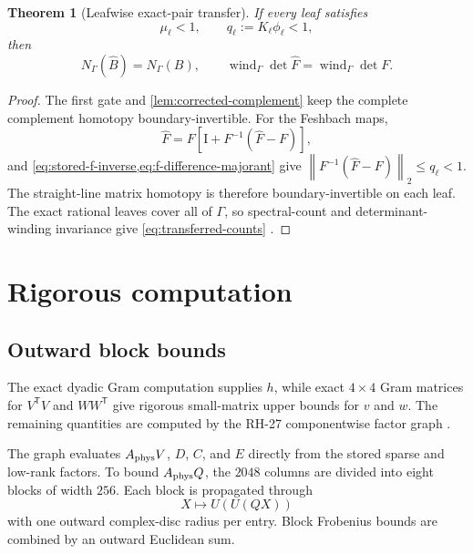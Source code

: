 \documentclass[11pt]{article}
\newtheorem{theorem}{Theorem}[section]
\theoremstyle{definition}
\theoremstyle{remark}
\newcommand{\Id}{\mathrm I}
\newcommand{\norm}[1]{\left\lVert#1\right\rVert}
\newcommand{\wind}{\operatorname{wind}}
\newcommand{\Aphys}{A_{\rm phys}}
\begin{document}
\begin{theorem}[Leafwise exact-pair transfer]
\label{thm:leafwise-transfer}
If every leaf satisfies
\begin{equation}
 \mu_\ell<1,\qquad
 q_\ell:=K_\ell\phi_\ell<1,
 \label{eq:two-gates}
\end{equation}
then
\begin{equation}
 N_\Gamma(\widehat B)=N_\Gamma(B),
 \qquad
 \wind_\Gamma\det\widehat F
 =\wind_\Gamma\det F.
 \label{eq:transferred-counts}
\end{equation}
\end{theorem}

\begin{proof}
The first gate and \cref{lem:corrected-complement} keep the complete
complement homotopy boundary-invertible.  For the Feshbach maps,
\[
 \widehat F
 =F\left[\Id+F^{-1}(\widehat F-F)\right],
\]
and \cref{eq:stored-f-inverse,eq:f-difference-majorant} give
\(\norm{F^{-1}(\widehat F-F)}_2\leq q_\ell<1\).
The straight-line matrix homotopy is therefore boundary-invertible on each
leaf.  The exact rational leaves cover all of \(\Gamma\), so spectral-count
and determinant-winding invariance give \cref{eq:transferred-counts}
\citep{Ahlfors1979,GohbergSigal1971}.
\end{proof}

\section{Rigorous computation}
\label{sec:computation}

\subsection{Outward block bounds}

The exact dyadic Gram computation supplies \(h\), while exact \(4\times4\)
Gram matrices for \(V^{\mathsf T}V\) and \(WW^{\mathsf T}\) give rigorous
small-matrix upper bounds for \(v\) and \(w\).  The remaining quantities are
computed by the RH-27 componentwise factor graph
\citep{WangOutwardCode2026}.

The graph evaluates \(\Aphys V\), \(D\), \(C\), and \(E\) directly from the
stored sparse and low-rank factors.  To bound \(\Aphys Q\), the \(2048\)
columns are divided into eight blocks of width \(256\).  Each block is
propagated through
\[
 X\longmapsto U(U(QX))
\]
with one outward complex-disc radius per entry.  Block Frobenius bounds are
combined by an outward Euclidean sum.
\end{document}
